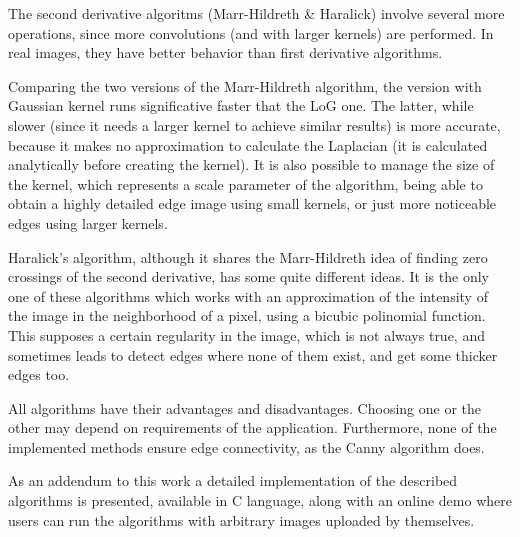 \documentclass{ipol}
\numberwithin{equation}{section}
\numberwithin{table}{section}
\begin{document}
The second derivative algoritms (Marr-Hildreth \& Haralick) involve several more operations, since more convolutions (and with larger kernels) are performed. In real images, they have better behavior than first derivative algorithms. 

Comparing the two versions of the Marr-Hildreth algorithm, the version with Gaussian kernel runs significative faster that the LoG one. The latter, while slower (since it needs a larger kernel to achieve similar results) is more accurate, because it makes no approximation to calculate the Laplacian (it is calculated analytically before creating the kernel). It is also possible to manage the size of the kernel, which represents a scale parameter of the algorithm, being able to obtain a highly detailed edge image using small kernels, or just more noticeable edges using larger kernels. 

Haralick's algorithm, although it shares the Marr-Hildreth idea of finding zero crossings of the second derivative, has some quite different ideas. It is the only one of these algorithms which works with an approximation of the intensity of the image in the neighborhood of a pixel, using a bicubic polinomial function. This supposes a certain regularity in the image, which is not always true, and sometimes leads to detect edges where none of them exist, and get some thicker edges too. 

All algorithms have their advantages and disadvantages. Choosing one or the other may depend on requirements of the application. Furthermore, none of the implemented methods ensure edge connectivity, as the Canny \cite{Canny1986} algorithm does.


As an addendum to this work a detailed implementation of the described algorithms is presented, 
available in C language, along with an online demo where users can run the algorithms 
with arbitrary images uploaded by themselves.

\clearpage




\end{document}
